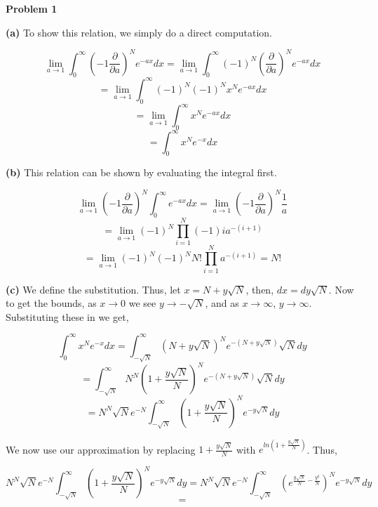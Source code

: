 \message{ !name(Assignment_1.tex)}\documentclass[11pt]{article}
\begin{document}


\textbf{Problem 1}

\textbf{(a)} To show this relation, we simply do a direct computation.

$$\lim_{a \to 1} \int_{0}^{\infty} \left(-1 \frac{\partial}{\partial a} \right)^{N}e^{-ax}dx = \lim_{a \to 1} \int_{0}^{\infty} (-1)^{N} \left(\frac{\partial}{\partial a} \right)^{N}e^{-ax}dx$$
$$ = \lim_{a \to 1} \int_{0}^{\infty} (-1)^{N}(-1)^{N} x^{N}e^{-ax}dx$$
$$ = \lim_{a \to 1} \int_{0}^{\infty} x^{N}e^{-ax}dx$$
$$ = \int_{0}^{\infty} x^{N}e^{-x}dx$$

\textbf{(b)} This relation can be shown by evaluating the integral first.

$$\lim_{a \to 1} \left(-1 \frac{\partial}{\partial a} \right)^{N} \int_{0}^{\infty}e^{-ax}dx = \lim_{a \to 1} \left(-1\frac{\partial}{\partial a}\right)^{N} \frac{1}{a}$$
$$ = \lim_{a\to 1} (-1)^{N} \prod_{i=1}^{N}(-1)ia^{-(i+1)}$$
$$ = \lim_{a\to 1}(-1)^{N}(-1)^{N}N! \prod_{i=1}^{N} a^{-(i+1)} = N!$$

\textbf{(c)} We define the substitution. Thus, let $x = N + y\sqrt{N}$, then, $dx = dy\sqrt{N}$. Now to get the bounds, as $x \to 0$ we see $y \to -\sqrt{N}$, and as $x \to \infty$, $y \to \infty$. Substituting these in we get,

$$\int_{0}^{\infty} x^{N}e^{-x}dx = \int_{-\sqrt{N}}^{\infty} (N+y\sqrt{N})^{N}e^{-(N+y\sqrt{N})}\sqrt{N}dy$$
$$ = \int_{-\sqrt{N}}^{\infty} N^{N}\left(1+\frac{y\sqrt{N}}{N}\right)^{N}e^{-(N+y\sqrt{N})}\sqrt{N}dy$$
$$ =N^{N}\sqrt{N}e^{-N} \int_{-\sqrt{N}}^{\infty} \left(1+\frac{y\sqrt{N}}{N}\right)^{N}e^{-y\sqrt{N}}dy$$

We now use our approximation by replacing $1+\frac{y\sqrt{N}}{N}$ with $e^{ln(1+\frac{y\sqrt{N}}{N})}$. Thus,

$$N^{N}\sqrt{N}e^{-N} \int_{-\sqrt{N}}^{\infty} \left(1+\frac{y\sqrt{N}}{N}\right)^{N}e^{-y\sqrt{N}}dy= N^{N}\sqrt{N}e^{-N} \int_{-\sqrt{N}}^{\infty} \left(e^{\frac{y\sqrt{N}}{N} - \frac{y^{2}}{N}}\right)^{N}e^{-y\sqrt{N}}dy$$
$$ = $$





\end{document}
